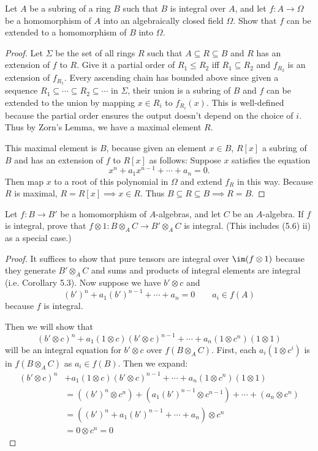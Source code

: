 \begin{exercise}
	Let $A$ be a subring of a ring $B$ such that $B$ is integral over $A$, and let $f \colon A \to \Omega$ be a homomorphism of $A$ into an algebraically closed field $\Omega$. Show that $f\!$ can be extended to a homomorphism of $B$ into $\Omega$.
\end{exercise}
\begin{proof}
	Let $\Sigma $ be the set of all rings $R $ such that $A \subseteq R \subseteq B $ and $R $ has an extension of $f $ to $R $.
	Give it a partial order of $R_{1} \le R_{2} $ iff $R_{1}\subseteq R_{2} $ and $f_{R_{2}}$ is an extension of $f_{R_{1}} $.
	Every ascending chain has bounded above since given a sequence $R_{1} \subseteq \cdots \subseteq R_{2} \subseteq \cdots  $ in $\Sigma $, their union is a subring of $B $ and $f $ can be extended to the union by mapping $x \in R_i $ to $f_{R_i}(x) $.
	This is well-defined because the partial order ensures the output doesn't depend on the choice of $i $.
	Thus by Zorn's Lemma, we have a maximal element $R $.

	This maximal element is $B $, because given an element $x \in B $, $R[x] $ a subring of $B $ and has an extension of $f $ to $R[x] $ as follows:
	Suppose $x $ satisfies the equation
	\[
		x^n + a_1 x^{n-1} + \cdots + a_n = 0
	.\] 
	Then map $x $ to a root of this polynomial in $\Omega $ and extend $f_R $ in this way.
	Because $R$ is maximal, $R = R[x] \implies x \in R $.
	Thus $B \subseteq R \subseteq B \implies R = B $.
\end{proof}

\begin{exercise}
	Let $f \colon B \to B'$ be a homomorphism of $A$-algebras, and let $C$ be an $A$-algebra. If $f$ is integral, prove that $f \otimes 1\colon B \otimes_A C \to B' \otimes_A C$ is integral. (This includes (5.6) ii) as a special case.)
\end{exercise}
\begin{proof}
	It suffices to show that pure tensors are integral over $\im(f \otimes 1) $ because they generate $B' \otimes _A C $ and sums and products of integral elements are integral (i.e. Corollary 5.3).
	Now suppose we have $b' \otimes c $ and
	\[
		(b')^n + a_1 (b')^{n-1} + \cdots + a_n = 0 \qquad a_i \in f(A)
	\] 
	because $f $ is integral.

	Then we will show that
	\[
		(b' \otimes c)^n + a_1(1 \otimes c) (b' \otimes c)^{n-1} + \cdots + a_n(1 \otimes c^n)(1 \otimes 1)
	\] 
	will be an integral equation for $b' \otimes c $ over $f(B \otimes_A C) $.
	First, each $a_i(1 \otimes c^i) $ is in $f(B \otimes_A C) $ as $a_i \in f(B) $.
	Then we expand:
	\begin{align*}
		(b' \otimes c)^n &+ a_1(1 \otimes c) (b' \otimes c)^{n-1} + \cdots + a_n(1 \otimes c^n)(1 \otimes 1)\\
		&= ((b')^n \otimes c^n) + (a_{1} (b')^{n-1}  \otimes c^{n-1} ) + \cdots + (a_n \otimes c^n)\\
		&= ((b')^n + a_1 (b')^{n-1} + \cdots + a_n) \otimes c^n\\
		&= 0 \otimes c^n = 0
	\end{align*}
\end{proof}


